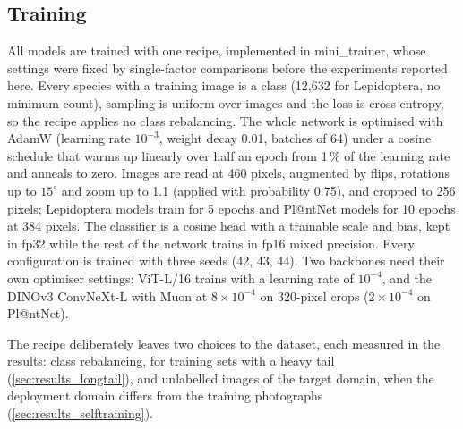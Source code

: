 \subsection{Training}\label{sec:training}
All models are trained with one recipe, implemented in mini\_trainer, whose settings were fixed by single-factor comparisons before the experiments reported here.
Every species with a training image is a class (12,632 for Lepidoptera, no minimum count), sampling is uniform over images and the loss is cross-entropy, so the recipe applies no class rebalancing.
The whole network is optimised with AdamW (learning rate $10^{-3}$, weight decay 0.01, batches of 64) under a cosine schedule that warms up linearly over half an epoch from 1\,\% of the learning rate and anneals to zero.
Images are read at 460 pixels, augmented by flips, rotations up to $15^\circ$ and zoom up to 1.1 (applied with probability 0.75), and cropped to 256 pixels; Lepidoptera models train for 5 epochs and Pl@ntNet models for 10 epochs at 384 pixels.
The classifier is a cosine head with a trainable scale and bias, kept in fp32 while the rest of the network trains in fp16 mixed precision.
Every configuration is trained with three seeds (42, 43, 44).
Two backbones need their own optimiser settings: ViT-L/16 trains with a learning rate of $10^{-4}$, and the DINOv3 ConvNeXt-L with Muon at $8\times10^{-4}$ on 320-pixel crops ($2\times10^{-4}$ on Pl@ntNet).

The recipe deliberately leaves two choices to the dataset, each measured in the results: class rebalancing, for training sets with a heavy tail (\cref{sec:results_longtail}), and unlabelled images of the target domain, when the deployment domain differs from the training photographs (\cref{sec:results_selftraining}).
